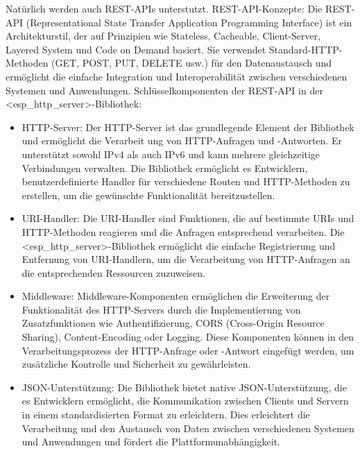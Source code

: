 Natürlich werden auch REST-APIs unterstutzt.
\newline
REST-API-Konzepte:
\newline
Die REST-API (Representational State Transfer Application Programming Interface) ist ein Architekturstil, der auf Prinzipien wie Stateless, Cacheable, Client-Server, Layered System und Code on Demand basiert. 
Sie verwendet Standard-HTTP-Methoden (GET, POST, PUT, DELETE usw.) für den Datenaustausch und ermöglicht die einfache Integration und Interoperabilität zwischen verschiedenen Systemen und Anwendungen.
\newline
Schlüsselkomponenten der REST-API in der <esp\_http\_server>-Bibliothek:
\begin{itemize}
    \item HTTP-Server:
    Der HTTP-Server ist das grundlegende Element der Bibliothek und ermöglicht die Verarbeit ung von HTTP-Anfragen und -Antworten. Er unterstützt sowohl 
    IPv4 als auch IPv6 und kann mehrere gleichzeitige Verbindungen verwalten. Die Bibliothek ermöglicht es Entwicklern, benutzerdefinierte Handler 
    für verschiedene Routen und HTTP-Methoden zu erstellen, um die gewünschte Funktionalität bereitzustellen.
    \item URI-Handler:
    Die URI-Handler sind Funktionen, die auf bestimmte URIs und HTTP-Methoden reagieren und die Anfragen entsprechend verarbeiten. 
    Die <esp\_http\_server>-Bibliothek ermöglicht die einfache Registrierung 
    und Entfernung von URI-Handlern, um die Verarbeitung von HTTP-Anfragen an die entsprechenden Ressourcen zuzuweisen.
    \item Middleware:
    Middleware-Komponenten ermöglichen die Erweiterung der Funktionalität des HTTP-Servers durch die Implementierung 
    von Zusatzfunktionen wie
    \newline Authentifizierung, CORS (Cross-Origin Resource Sharing), Content-Encoding oder Logging. 
    Diese Komponenten können in den Verarbeitungsprozess der HTTP-Anfrage oder -Antwort eingefügt werden, um zusätzliche Kontrolle und Sicherheit zu gewährleisten.
    \item JSON-Unterstützung:
    Die Bibliothek bietet native JSON-Unterstützung, die es Entwicklern ermöglicht, die Kommunikation zwischen 
    Clients und Servern in einem standardisierten Format zu erleichtern. 
    Dies erleichtert die Verarbeitung und den Austausch von Daten zwischen verschiedenen Systemen und Anwendungen und fördert die Plattformunabhängigkeit. 
\end{itemize}



